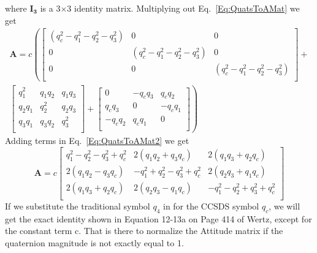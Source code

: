 %
where $\mathbf{I_3}$ is a 3$\times$3 identity matrix.  Multiplying out
Eq.~\ref{Eq:QuatsToAMat} we get
%
\begin{multline}
         \mathbf{A} =
          c\left(
              \begin{bmatrix}
              (q_c^2-q_1^2-q_2^2-q_3^2) &             0             &             0             \\
                          0             & (q_c^2-q_1^2-q_2^2-q_3^2) &             0             \\
                          0             &             0             & (q_c^2-q_1^2-q_2^2-q_3^2) \\
              \end{bmatrix} + \right. \\
              \left.
              \begin{bmatrix}
              q_1^2   & q_1 q_2 & q_1 q_3 \\
              q_2 q_1 & q_2^2   & q_2 q_3 \\
              q_3 q_1 & q_3 q_2 & q_3^2   \\
              \end{bmatrix} +
              \begin{bmatrix}
                  0    & -q_c q_3 &  q_c q_2 \\
               q_c q_3 &     0    & -q_c q_1 \\
              -q_c q_2 &  q_c q_1 &     0    \\
              \end{bmatrix}
              \right)
          \label{Eq:QuatsToAMat2}
\end{multline}
%
Adding terms in Eq.~\ref{Eq:QuatsToAMat2} we get
%
\begin{equation}
    \mathbf{A} = c
        \begin{bmatrix}
        q_1^2-q_2^2-q_3^2+q_c^2 &     2(q_1q_2+q_3q_c)     &     2(q_1q_3+q_2q_c)     \\
           2(q_1q_2-q_3q_c)     & -q_1^2+q_2^2-q_3^2+q_c^2 &     2(q_2q_3+q_1q_c)     \\
           2(q_1q_3+q_2q_c)     &     2(q_2q_3-q_1q_c)     & -q_1^2-q_2^2+q_3^2+q_c^2 \\
        \end{bmatrix}
    \label{Eq:AMatQuats}
\end{equation}
%
If we substitute the traditional symbol $q_4$ in for the CCSDS symbol $q_c$, we
will get the exact identity shown in Equation 12-13a on Page 414 of Wertz, except
for the constant term c.  That is there to normalize the Attitude matrix if the
quaternion magnitude is not exactly equal to 1.

